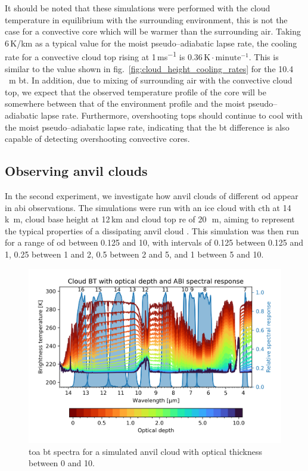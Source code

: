 It should be noted that these simulations were performed with the cloud temperature in equilibrium with the surrounding environment, this is not the case for a convective core which will be warmer than the surrounding air.
Taking 6\,\unit{K/km} as a typical value for the moist pseudo--adiabatic lapse rate, the cooling rate for a convective cloud top rising at 1\,\unit{ms^{-1}} is 0.36\,$\mathrm{K \cdot minute^{-1}}$.
This is similar to the value shown in fig.~\ref{fig:cloud_height_cooling_rates} for the 10.4\,\unit{\mu m} \acrshort{bt}.
In addition, due to mixing of surrounding air with the convective cloud top, we expect that the observed temperature profile of the core will be somewhere between that of the environment profile and the moist pseudo--adiabatic lapse rate.
Furthermore, overshooting tops should continue to cool with the moist pseudo--adiabatic lapse rate, indicating that the \acrshort{bt} difference is also capable of detecting overshooting convective cores.

\subsection{Observing anvil clouds} \label{sec:theory_anvil}

In the second experiment, we investigate how anvil clouds of different \acrfull{od} appear in \acrshort{abi} observations.
The simulations were run with an ice cloud with \acrshort{cth} at 14\,\unit{k m}, cloud base height at 12\,\unit{km} and cloud top \acrshort{re} of 20\,\unit{\mu m}, aiming to represent the typical properties of a dissipating anvil cloud \citep{sokol_tropical_2020}.
This simulation was then run for a range of \acrshort{od} between 0.125 and 10, with intervals of 0.125 between 0.125 and 1, 0.25 between 1 and 2, 0.5 between 2 and 5, and 1 between 5 and 10.

\begin{figure}[tp]
    \includegraphics[width=\textwidth]{figures/chapter1_08.png}
    \caption[
    \acrshort{toa} \acrshort{bt} spectra for a simulated anvil cloud with optical thickness between 0 and 10
    ]{
    \acrshort{toa} \acrshort{bt} spectra for a simulated anvil cloud with optical thickness between 0 and 10. 
    }
    \label{fig:optical_depth_spectra}
\end{figure}

